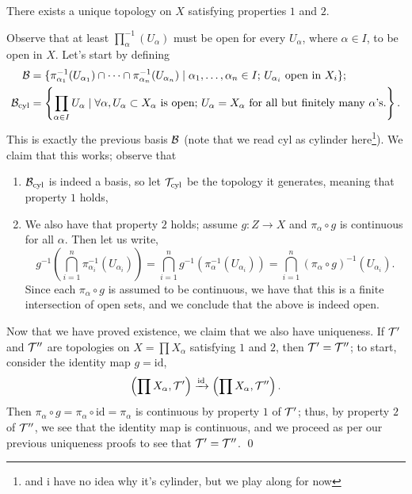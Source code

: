 \newpage
\begin{simpleclaim}
    There exists a unique topology on $X$ satisfying properties $1$ and $2$.
\end{simpleclaim}
\noindent Observe that at least $\prod_\alpha^{-1} (U_\alpha)$ must be open for every $U_\alpha$, where $\alpha \in I$, to be open in $X$. Let's start by defining
\begin{align*}
    \mathcal B &= \{\pi_{\alpha_1}^{-1} (U_{\alpha_1}) \cap \dots \cap \pi_{\alpha_n}^{-1} (U_{\alpha_n}) \mid \alpha_1, \dots, \alpha_n \in I; \, U_{\alpha_i} \text{ open in } X_i \}; \\
    \mathcal B_\mathrm{cyl} &= \left\{ \prod_{\alpha \in I} U_\alpha \mid \forall \alpha, U_\alpha \subset X_\alpha \text{ is open}; \, U_\alpha = X_\alpha \text{ for all but finitely many } \alpha \text{'s.} \right\}.
\end{align*}
This is exactly the previous basis $\mathcal B$ (note that we read cyl as cylinder here\footnote{and i have no idea why it's cylinder, but we play along for now}). We claim that this works; observe that
\begin{enumerate}[label=(\alph*)]
    \item $\mathcal B_\mathrm{cyl}$ is indeed a basis, so let $\mathcal T_\mathrm{cyl}$ be the topology it generates, meaning that property $1$ holds,
    \item We also have that property $2$ holds; assume $g : Z \to X$ and $\pi_\alpha \circ g$ is continuous for all $\alpha$. Then let us write,
    \[ g^{-1} \left( \bigcap_{i=1}^n \pi_{\alpha_i}^{-1} (U_{\alpha_i}) \right) = \bigcap_{i=1}^n g^{-1} (\pi_\alpha^{-1} (U_{\alpha_i})) = \bigcap_{i=1}^n (\pi_\alpha \circ g)^{-1} (U_{\alpha_i}). \]
    Since each $\pi_\alpha \circ g$ is assumed to be continuous, we have that this is a finite intersection of open sets, and we conclude that the above is indeed open.
\end{enumerate}
Now that we have proved existence, we claim that we also have uniqueness. If $\mathcal T'$ and $\mathcal T''$ are topologies on $X = \prod X_\alpha$ satisfying $1$ and $2$, then $\mathcal T' = \mathcal T''$; to start, consider the identity map $g = \mathrm{id}$,
\[ \left(\prod X_\alpha, \mathcal T' \right) \xrightarrow[]{\mathrm{id}} \left(\prod X_\alpha, \mathcal T'' \right). \]
Then $\pi_\alpha \circ g = \pi_\alpha \circ \mathrm{id} = \pi_\alpha$ is continuous by property $1$ of $\mathcal T'$; thus, by property $2$ of $\mathcal T''$, we see that the identity map is continuous, and we proceed as per our previous uniqueness proofs to see that $\mathcal T' = \mathcal T''$. \qed
\medskip\newline
